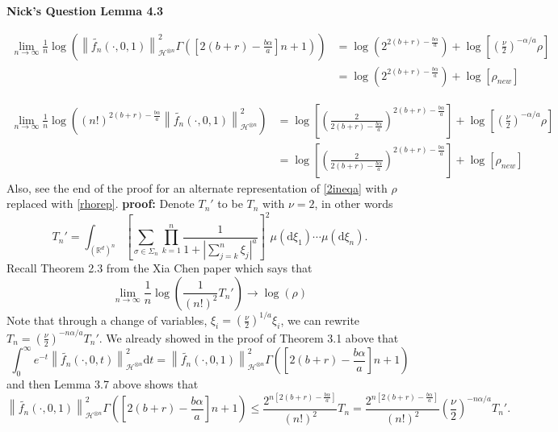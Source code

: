 \documentclass[a4paper,11pt]{article}
\numberwithin{equation}{section}
\theoremstyle{plain}
\theoremstyle{definition}
\newcommand{\ud}{\ensuremath{\mathrm{d} }}
\newcommand{\Norm}[1]{\left\|  #1   \right\|}
\newcommand{\R}{\mathbb{R}}
\newcounter{NQ}
\newenvironment{NickQuestion}[1][] %
{\refstepcounter{NQ}
	\begin{mdframed}[backgroundcolor=lightgray]\textbf{Nick's Question \theNQ \: #1~~}~~~\noindent}%
	{\end{mdframed}}
\numberwithin{NQ}{section}
\numberwithin{LQ}{section}
\numberwithin{ZQ}{section}
\begin{document}
	\begin{NickQuestion}[Lemma 4.3]

		\begin{align}
		\lim_{n \to \infty}  \frac{1}{n} \log \left( \Norm{ \tilde{f_n}(\cdot,0,1) }_{ \mathcal{H}^{\otimes n} }^2 \Gamma\left( \left[ 2(b+r)- \frac{b \alpha}{a} \right] n +1 \right) \right) &= \log\left(2^{2(b+r)-\frac{b\alpha}{a}}\right) + \log\left[\left( \frac{\nu}{2} \right)^{-\alpha/a}\rho\right] \label{2ineqa}
		\\&=\log\left(2^{2(b+r)-\frac{b\alpha}{a}}\right) + \log\left[\rho_{new}\right]
		\end{align}

		\begin{align}
		\lim_{n \to \infty}  \frac{1}{n} \log \left( (n!)^{2(b+r)- \frac{b \alpha}{a} }\Norm{ \tilde{f_n}(\cdot,0,1) }_{ \mathcal{H}^{\otimes n} }^2  \right) &=  \log\left[\left(\frac{2}{2(b+r)-\frac{b\alpha}{a}}\right)^{2(b+r)-\frac{b\alpha}{a}}\right] + \log\left[\left( \frac{\nu}{2} \right)^{-\alpha/a}\rho\right] \label{2ineqb}
		\\&=  \log\left[\left(\frac{2}{2(b+r)-\frac{b\alpha}{a}}\right)^{2(b+r)-\frac{b\alpha}{a}}\right] + \log\left[\rho_{new}\right]
		\end{align}
		Also, see the end of the proof for an alternate representation of \ref{2ineqa} with $\rho$ replaced with \ref{rhorep}.
		\textbf{proof:} Denote $T_n'$ to be $T_n$ with $\nu=2$, in other words
		\[
		T_n' = \int_{(\R^d)^n} \left[\sum_{\sigma \in \Sigma_n} \prod_{k=1}^n \frac{1}{1+\left|\sum_{j=k}^n \xi_j \right|^a}\right]^2 \mu(\ud \xi_1)\cdots \mu(\ud \xi_n).
		\]
		Recall Theorem 2.3 from the Xia Chen paper which says that
		\[
		\lim_{n \to \infty} \frac{1}{n} \log\left( \frac{1}{(n!)^2} T_n'\right) \to \log(\rho)
		\]
		Note that through a change of variables, $\xi_i = \left(\frac{\nu}{2}\right)^{1/a}\xi_i$, we can rewrite $T_n = \left( \frac{\nu}{2} \right)^{-n\alpha/a} T_n'$. We already showed in the proof of Theorem 3.1 above that
		\[
		\int_0^\infty e^{-t} \Norm{ \tilde{f_n}(\cdot,0,t) }_{ \mathcal{H}^{\otimes n} }^2 \ud t = \Norm{ \tilde{f_n}(\cdot,0,1) }_{ \mathcal{H}^{\otimes n} }^2 \Gamma\left( \left[ 2(b+r)- \frac{b \alpha}{a} \right] n +1 \right)
		\]
		and then Lemma 3.7 above shows that
		\[
		\Norm{ \tilde{f_n}(\cdot,0,1) }_{ \mathcal{H}^{\otimes n} }^2 \Gamma\left( \left[ 2(b+r)- \frac{b \alpha}{a} \right] n +1 \right) \le \dfrac{2^{n\left[2(b+r)-\frac{b\alpha}{a}\right]}}{(n!)^2} T_n = \dfrac{2^{n\left[2(b+r)-\frac{b\alpha}{a}\right]}}{(n!)^2}  \left( \frac{\nu}{2} \right)^{-n\alpha/a} T_n'.
\]
\end{NickQuestion}
\end{document}
